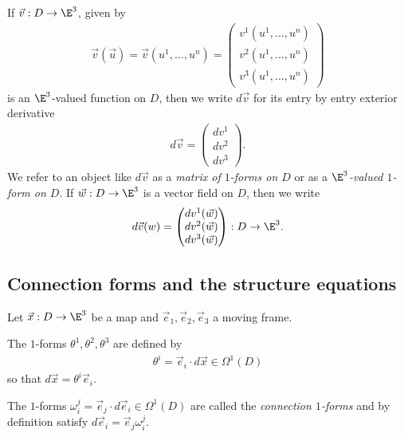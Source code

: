 \documentclass{article}
\begin{document}
\begin{definition}
	If $\vec v:D\to\E^3$, given by
	\begin{align*}
		\vec v(\vec u)=\vec v(u^1,...,u^n)=\begin{pmatrix}
			                                   v^1(u^1,...,u^n) \\
			                                   v^2(u^1,...,u^n) \\
			                                   v^3(u^1,...,u^n)
		                                   \end{pmatrix}
	\end{align*}
	is an $\E^3$-valued function on $D$, then we write $d\vec v$ for its entry
	by entry exterior derivative
	\begin{align*}
		d\vec v = \begin{pmatrix}
			          dv^1 \\ dv^2 \\ dv^3
		          \end{pmatrix}.
	\end{align*}
	We refer to an object like $d\vec v$ as a \emph{matrix of $1$-forms on $D$} or as a
	\emph{$\E^3$-valued $1$-form on $D$}. If $\vec w:D\to\E^3$ is a vector field on $D$, then we write
	\begin{align*}
		d\vec v(w) = \begin{pmatrix}
			             dv^1(\vec w) \\ dv^2(\vec w) \\ dv^3(\vec w)
		             \end{pmatrix} : D\to\E^3.
	\end{align*}
\end{definition}

\subsection{Connection forms and the structure equations}

Let $\vec x : D \to \E^3$ be a map and $\vec e_1,\vec e_2,\vec e_3$ a moving frame.

\begin{definition}
	The $1$-forms $\theta^1,\theta^2,\theta^3$ are defined by
	\begin{align*}
		\theta^i = \vec e_i \cdot d\vec x \in \Omega^1(D)
	\end{align*}
	so that $d\vec x = \theta^i\vec e_i$.
\end{definition}

\begin{definition}
	The $1$-forms $\omega_i^j=\vec e_j\cdot d\vec e_i\in\Omega^1(D)$ are called the
	\emph{connection $1$-forms} and by definition satisfy $d\vec e_i = \vec e_j\omega_i^j$.
\end{definition}
\end{document}
